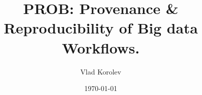 \documentclass{beamer}
\title{PROB: Provenance \& Reproducibility of Big data Workflows.}
\author{Vlad Korolev}
\date[]{ \today}
\begin{document}
{
\begin{frame}
  \titlepage
\end{frame}
}





\end{document}
